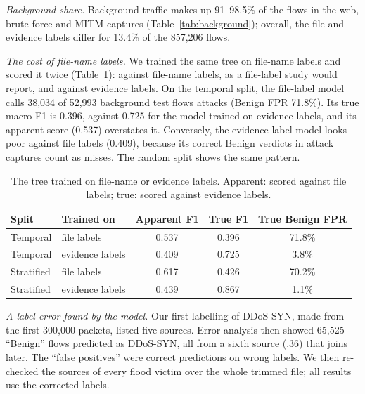 \emph{Background share.} Background traffic makes up 91--98.5\% of the flows in the web, brute-force and MITM captures (Table~\ref{tab:background}); overall, the file and evidence labels differ for 13.4\% of the 857,206 flows.

\emph{The cost of file-name labels.} We trained the same tree on file-name labels and scored it twice (Table~\ref{tab:filelabel}): against file-name labels, as a file-label study would report, and against evidence labels. On the temporal split, the file-label model calls 38,034 of 52,993 background test flows attacks (Benign FPR 71.8\%). Its true macro-F1 is 0.396, against 0.725 for the model trained on evidence labels, and its apparent score (0.537) overstates it. Conversely, the evidence-label model looks poor against file labels (0.409), because its correct Benign verdicts in attack captures count as misses. The random split shows the same pattern.

\begin{table}[t]
\centering
\caption{The tree trained on file-name or evidence labels. Apparent: scored against file labels; true: scored against evidence labels.}
\label{tab:filelabel}
\footnotesize
\setlength{\tabcolsep}{3pt}
\begin{tabular}{llccc}
\hline
Split & Trained on & Apparent F1 & True F1 & True Benign FPR \\
\hline
Temporal   & file labels     & 0.537 & 0.396 & 71.8\% \\
Temporal   & evidence labels & 0.409 & 0.725 & 3.8\% \\
Stratified & file labels     & 0.617 & 0.426 & 70.2\% \\
Stratified & evidence labels & 0.439 & 0.867 & 1.1\% \\
\hline
\end{tabular}
\end{table}

\emph{A label error found by the model.} Our first labelling of DDoS-SYN, made from the first 300,000 packets, listed five sources. Error analysis then showed 65,525 ``Benign'' flows predicted as DDoS-SYN, all from a sixth source (.36) that joins later. The ``false positives'' were correct predictions on wrong labels. We then re-checked the sources of every flood victim over the whole trimmed file; all results use the corrected labels.
